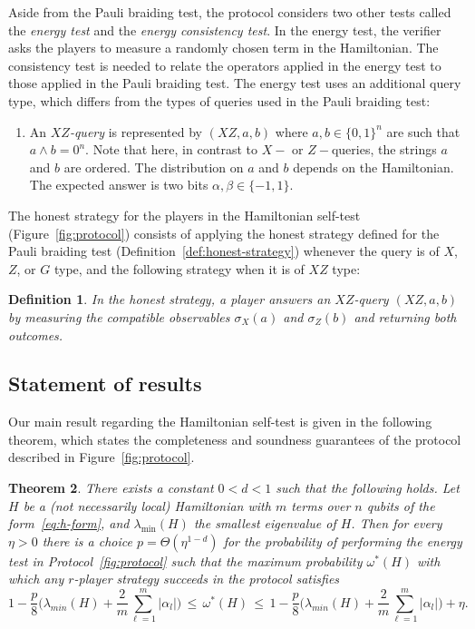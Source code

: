 \documentclass[11pt,letterpaper]{article}
\newcommand{\<}{\langle}
\renewcommand{\>}{\rangle}
\newtheorem{theorem}{Theorem}
\newtheorem{definition}[theorem]{Definition}
\begin{document}
Aside from the Pauli braiding test, the protocol considers two other
tests called the \emph{energy test} and the \emph{energy consistency
  test}. In the energy test, the verifier asks the players to measure
a randomly chosen term in the Hamiltonian. The consistency test is
needed to relate the operators applied in the energy test
to those applied in the Pauli braiding test.
The energy test uses an additional query type, which differs from the types of queries used in the Pauli braiding test:
\begin{enumerate}
\item[3.] An \emph{$XZ$-query} is represented by $(XZ, a, b)$ where $a,b\in\{0,1\}^n$ are  such that $a\wedge b = 0^n$. Note that here, in contrast to $X-$ or $Z-$queries, the strings $a$ and $b$ are ordered. The distribution on $a$ and $b$ depends on the Hamiltonian. The expected answer is two bits $\alpha,\beta\in\{-1,1\}$.
\end{enumerate}

The honest strategy for the players in the Hamiltonian self-test (Figure~\ref{fig:protocol}) consists of applying the honest strategy defined for the Pauli braiding test (Definition~\ref{def:honest-strategy}) whenever the query is of $X$, $Z$, or $G$ type, and the following strategy when it is of $XZ$ type:

\begin{definition}\label{def:honest-h}
In the honest strategy, a player answers an $XZ$-query $(XZ,a,b)$ by measuring the compatible observables $\sigma_X(a)$ and $\sigma_Z(b)$ and returning both outcomes.
\end{definition}



\subsection{Statement of results}

Our main result regarding the Hamiltonian self-test is given in the following theorem, which states the completeness and soundness guarantees of the protocol described in Figure~\ref{fig:protocol}.

\begin{theorem}\label{thm:main}
There exists a constant $0<d<1$ such that the following holds. 
  Let $H$ be a (not necessarily local) Hamiltonian with $m$ terms over $n$ qubits of the form~\eqref{eq:h-form}, and
  $\lambda_{\min}(H)$ the smallest eigenvalue of $H$. Then for every $\eta>0$ there is a choice $p=\Theta(\eta^{1-d})$ for the probability of performing the energy test  in Protocol~\ref{fig:protocol} such that the maximum probability $\omega^*(H)$ with which any $r$-player strategy succeeds in the protocol satisfies
  \[ 1 - \frac{p}{8}\Big(\lambda_{min}(H) + \frac{2}{m}\sum_{\ell=1}^m |\alpha_l|\Big) \,\leq\, \omega^*(H) \,\leq\, 1 - \frac{p}{8}\Big(\lambda_{min}(H) + \frac{2}{m}\sum_{\ell=1}^m |\alpha_l|\Big) + \eta. \]
\end{theorem}
\end{document}
